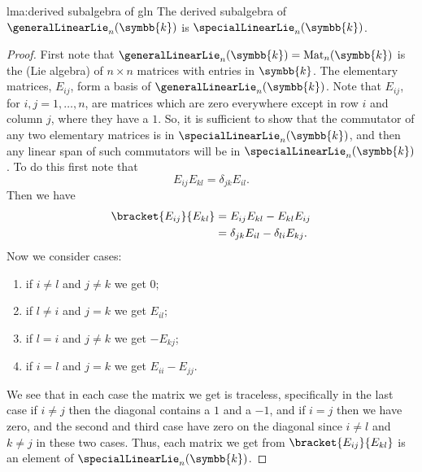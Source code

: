 \documentclass[fleqn]{NotesClass}
\renewcommand{\field}{\symbb{k}}
\begin{document}
    \begin{lma}{}{lma:derived subalgebra of gln}
        The derived subalgebra of \(\generalLinearLie_n(\field)\) is \(\specialLinearLie_n(\field)\).
        \begin{proof}
            First note that \(\generalLinearLie_n(\field) = \matrices{n}{\field}\) is the (Lie algebra) of \(n \times n\) matrices with entries in \(\field\).
            The elementary matrices, \(E_{ij}\), form a basis of \(\generalLinearLie_n(\field)\).
            Note that \(E_{ij}\), for \(i, j = 1, \dotsc, n\), are matrices which are zero everywhere except in row \(i\) and column \(j\), where they have a \(1\).
            So, it is sufficient to show that the commutator of any two elementary matrices is in \(\specialLinearLie_n(\field)\), and then any linear span of such commutators will be in \(\specialLinearLie_n(\field)\).
            To do this first note that
            \begin{equation}
                E_{ij}E_{kl} = \delta_{jk} E_{il}.
            \end{equation}
            Then we have
            \begin{align}
                \bracket{E_{ij}}{E_{kl}} &= E_{ij}E_{kl} - E_{kl}E_{ij}\\
                &= \delta_{jk}E_{il} - \delta_{li}E_{kj}.
            \end{align}
            Now we consider cases:
            \begin{enumerate}
                \item if \(i \ne l\) and \(j \ne k\) we get \(0\);
                \item if \(l \ne i\) and \(j = k\) we get \(E_{il}\);
                \item if \(l = i\) and \(j \ne k\) we get \(-E_{kj}\);
                \item if \(i = l\) and \(j = k\) we get \(E_{ii} - E_{jj}\).
            \end{enumerate}
            We see that in each case the matrix we get is traceless, specifically in the last case if \(i \ne j\) then the diagonal contains a \(1\) and a \(-1\), and if \(i = j\) then we have zero, and the second and third case have zero on the diagonal since \(i \ne l\) and \(k \ne j\) in these two cases.
            Thus, each matrix we get from \(\bracket{E_{ij}}{E_{kl}}\) is an element of \(\specialLinearLie_n(\field)\).
        \end{proof}
    \end{lma}
    
\end{document}
